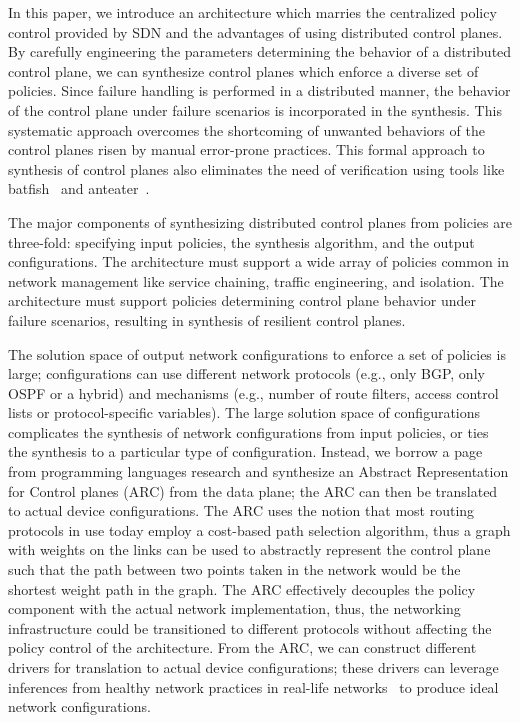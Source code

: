 
In this paper, we introduce an architecture which marries the centralized
policy control provided by SDN and the advantages of using
distributed control planes. 
By carefully engineering the parameters determining the
behavior of a distributed control plane, 
we can synthesize control planes which
enforce a diverse set of policies. 
Since failure handling is 
performed in a distributed manner, the behavior of the control
plane under failure scenarios is incorporated in the synthesis. 
This systematic approach overcomes the shortcoming of unwanted
behaviors of the control planes risen by manual error-prone
practices. This
formal approach to synthesis of control planes also eliminates the need of 
verification using tools like batfish~\cite{batfish} and anteater~\cite{anteater}.

The major components of synthesizing distributed control planes from 
policies are three-fold: specifying input policies, the synthesis 
algorithm, and the output configurations. The architecture must 
support a wide array of policies common in network management like service
chaining, traffic engineering, and isolation. The architecture must
support policies determining control plane behavior under failure scenarios,
resulting in synthesis of resilient control planes. 

The solution space of output network configurations to enforce a set of policies
is large; configurations can use different 
network protocols (e.g., only BGP, only OSPF or a hybrid) and
mechanisms (e.g., number of route filters, access control lists
or protocol-specific variables). The large solution space
of configurations complicates the synthesis of
network configurations from
input policies, 
or ties the synthesis to a particular type of configuration. 
Instead, we borrow a page from programming languages
research and
synthesize an Abstract Representation for Control planes (ARC) from 
the data plane; the ARC can then be translated to actual device configurations.
The ARC uses the notion that most routing protocols in use 
today employ a cost-based path selection algorithm, thus a graph with
weights on the links can be used to abstractly represent the control plane such that 
the path between two points taken in the network would be 
the shortest weight path in the graph. 
The ARC effectively decouples the policy component with the 
actual network implementation, thus, the networking infrastructure could be
transitioned to different protocols without affecting the policy 
control of the architecture. From the ARC, we can construct different
drivers for translation to actual device configurations; these drivers
can leverage inferences from healthy network practices in 
real-life networks~\cite{mpa-imc15} to produce ideal network configurations.

